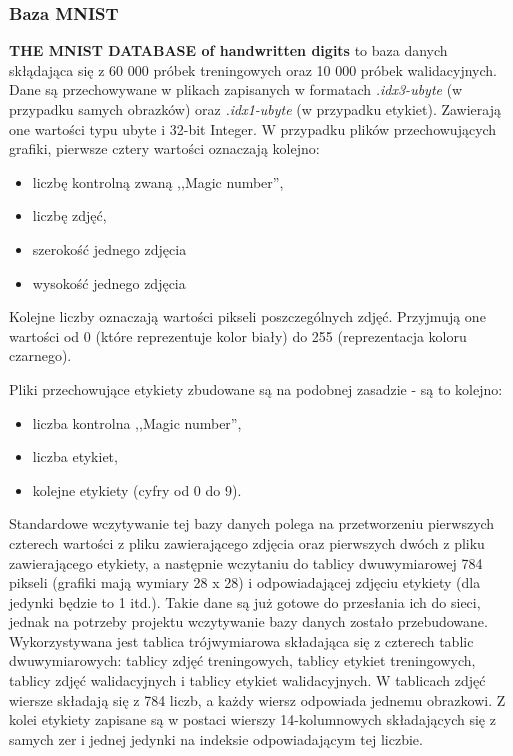 \documentclass[12pt,a4paper]{article}
\begin{document}
	\subsubsection*{Baza MNIST}
	\hspace{20pt}\textbf{THE MNIST DATABASE of handwritten digits} to baza danych skłądająca się z 60 000 próbek treningowych oraz 10 000 próbek walidacyjnych. Dane są przechowywane w plikach zapisanych w formatach \textit{.idx3-ubyte} (w przypadku samych obrazków) oraz \textit{.idx1-ubyte} (w przypadku etykiet). Zawierają one wartości typu ubyte i 32-bit Integer. W przypadku plików przechowujących grafiki, pierwsze cztery wartości oznaczają kolejno:
	\begin{itemize}
	\item liczbę kontrolną zwaną ,,Magic number'',
	\item liczbę zdjęć,
	\item szerokość jednego zdjęcia
	\item wysokość jednego zdjęcia
	\end{itemize}
	\hspace{20pt} Kolejne liczby oznaczają wartości pikseli poszczególnych zdjęć. Przyjmują one wartości od 0 (które reprezentuje kolor biały) do 255 (reprezentacja koloru czarnego).
	
	\vspace{15pt}
	Pliki przechowujące etykiety zbudowane są na podobnej zasadzie - są to kolejno:
	\begin{itemize}
	\item liczba kontrolna ,,Magic number'',
	\item liczba etykiet,
	\item kolejne etykiety (cyfry od 0 do 9).
	\end{itemize}
	
	\vspace{15pt}
	Standardowe wczytywanie tej bazy danych polega na przetworzeniu pierwszych czterech wartości z pliku zawierającego zdjęcia oraz pierwszych dwóch z pliku zawierającego etykiety, a następnie wczytaniu do tablicy dwuwymiarowej 784 pikseli (grafiki mają wymiary 28 x 28) i odpowiadającej zdjęciu etykiety (dla jedynki będzie to 1 itd.). Takie dane są już gotowe do przesłania ich do sieci, jednak na potrzeby projektu wczytywanie bazy danych zostało przebudowane. Wykorzystywana jest tablica trójwymiarowa składająca się z czterech tablic dwuwymiarowych: tablicy zdjęć treningowych, tablicy etykiet treningowych, tablicy zdjęć walidacyjnych i tablicy etykiet walidacyjnych. W tablicach zdjęć wiersze składają się z 784 liczb, a każdy wiersz odpowiada jednemu obrazkowi. Z kolei etykiety zapisane są w postaci wierszy 14-kolumnowych składających się z samych zer i jednej jedynki na indeksie odpowiadającym tej liczbie.
	
\end{document}
